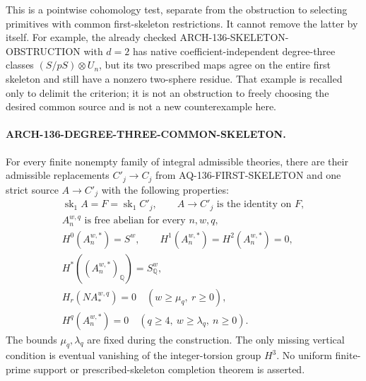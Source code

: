 This is a pointwise cohomology test, separate from the obstruction
to selecting primitives with common first-skeleton restrictions.
It cannot remove the latter by itself. For example, the
already checked ARCH-136-SKELETON-OBSTRUCTION with \(d=2\)
has native coefficient-independent degree-three classes
\((S/pS)\otimes U_n\), but its two prescribed maps agree on
the entire first skeleton and still have a nonzero two-sphere
residue. That example is recalled only to delimit the criterion;
it is not an obstruction to freely choosing the desired common
source and is not a new counterexample here.

\paragraph{ARCH-136-DEGREE-THREE-COMMON-SKELETON.}
For every finite nonempty family of integral admissible theories,
there are their admissible replacements \(C'_j\to C_j\) from
AQ-136-FIRST-SKELETON and one strict source \(A\to C'_j\)
with the following properties:
\[
\begin{gathered}
 \operatorname{sk}_1 A=F=\operatorname{sk}_1 C'_j,
 \qquad A\to C'_j\text{ is the identity on }F,\\
 A_n^{w,q}\text{ is free abelian for every }n,w,q,\\
 H^0(A_n^{w,*})=S^w,\qquad
                 H^1(A_n^{w,*})=H^2(A_n^{w,*})=0,\\
 H^*((A_n^{w,*})_{\mathbb Q})=S_{\mathbb Q}^w,\\
 H_r(NA_*^{w,q})=0\quad(w\geq\mu_q,\ r\geq0),\\
 H^q(A_n^{w,*})=0\quad(q\geq4,\ w\geq\lambda_q,\ n\geq0).
\end{gathered}                                             \tag{136.DT3C1}
\]
The bounds \(\mu_q,\lambda_q\) are fixed during the construction.
The only missing vertical condition is eventual vanishing of
the integer-torsion group \(H^3\). No uniform finite-prime
support or prescribed-skeleton completion theorem is asserted.


